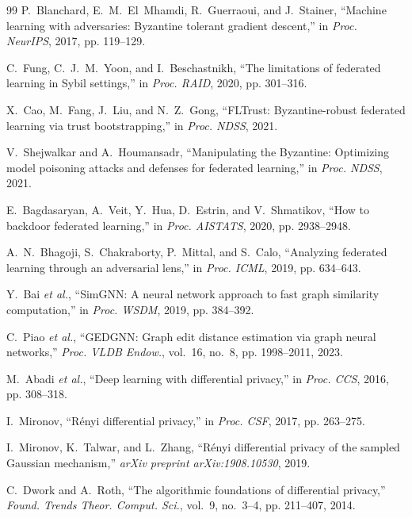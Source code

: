 \documentclass[journal]{IEEEtran}
\begin{document}
\begin{thebibliography}{99}
  P.~Blanchard, E.~M.~El~Mhamdi, R.~Guerraoui, and J.~Stainer,
  ``Machine learning with adversaries: {Byzantine} tolerant gradient descent,''
  in \emph{Proc. NeurIPS}, 2017, pp. 119--129.

  C.~Fung, C.~J.~M.~Yoon, and I.~Beschastnikh,
  ``The limitations of federated learning in {Sybil} settings,''
  in \emph{Proc. RAID}, 2020, pp. 301--316.

  X.~Cao, M.~Fang, J.~Liu, and N.~Z.~Gong,
  ``{FLTrust}: {Byzantine}-robust federated learning via trust bootstrapping,''
  in \emph{Proc. NDSS}, 2021.

  V.~Shejwalkar and A.~Houmansadr,
  ``Manipulating the {Byzantine}: Optimizing model poisoning attacks and defenses for federated learning,''
  in \emph{Proc. NDSS}, 2021.

  E.~Bagdasaryan, A.~Veit, Y.~Hua, D.~Estrin, and V.~Shmatikov,
  ``How to backdoor federated learning,''
  in \emph{Proc. AISTATS}, 2020, pp. 2938--2948.

  A.~N.~Bhagoji, S.~Chakraborty, P.~Mittal, and S.~Calo,
  ``Analyzing federated learning through an adversarial lens,''
  in \emph{Proc. ICML}, 2019, pp. 634--643.

  Y.~Bai \emph{et al.},
  ``{SimGNN}: A neural network approach to fast graph similarity computation,''
  in \emph{Proc. WSDM}, 2019, pp. 384--392.

  C.~Piao \emph{et al.},
  ``{GEDGNN}: Graph edit distance estimation via graph neural networks,''
  \emph{Proc. VLDB Endow.}, vol.~16, no.~8, pp. 1998--2011, 2023.

  M.~Abadi \emph{et al.},
  ``Deep learning with differential privacy,''
  in \emph{Proc. CCS}, 2016, pp. 308--318.

  I.~Mironov,
  ``R\'enyi differential privacy,''
  in \emph{Proc. CSF}, 2017, pp. 263--275.

  I.~Mironov, K.~Talwar, and L.~Zhang,
  ``R\'enyi differential privacy of the sampled {Gaussian} mechanism,''
  \emph{arXiv preprint arXiv:1908.10530}, 2019.

  C.~Dwork and A.~Roth,
  ``The algorithmic foundations of differential privacy,''
  \emph{Found. Trends Theor. Comput. Sci.}, vol.~9, no.~3--4, pp. 211--407, 2014.


\end{thebibliography}
\end{document}
